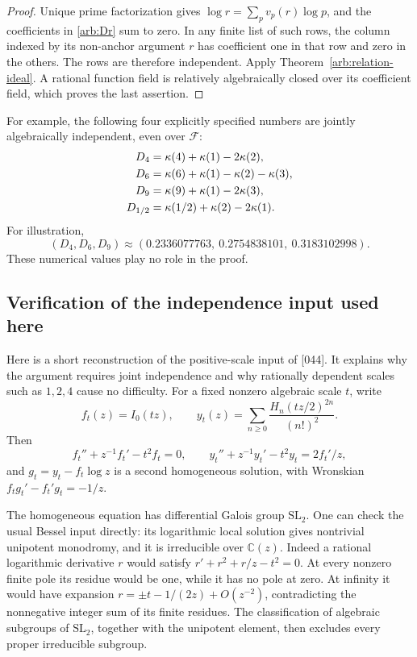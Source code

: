 \documentclass[11pt,a4paper]{article}
\theoremstyle{definition}
\theoremstyle{remark}
\numberwithin{equation}{section}
\begin{document}
\begin{proof}
Unique prime factorization gives
\(\log r=\sum_pv_p(r)\log p\), and the coefficients in
\eqref{arb:Dr} sum to zero.  In any finite list of such rows,
the column indexed by its non-anchor argument \(r\) has coefficient
one in that row and zero in the others.  The rows are therefore
independent.  Apply Theorem~\ref{arb:relation-ideal}.
A rational function field is relatively algebraically closed over
its coefficient field, which proves the last assertion.
\end{proof}

For example, the following four explicitly specified numbers are
jointly algebraically independent, even over \(\mathcal F\):
\begin{align*}
 D_4&=\kappa(4)+\kappa(1)-2\kappa(2),\\
 D_6&=\kappa(6)+\kappa(1)-\kappa(2)-\kappa(3),\\
 D_9&=\kappa(9)+\kappa(1)-2\kappa(3),\\
 D_{1/2}&=\kappa(1/2)+\kappa(2)-2\kappa(1).
\end{align*}
For illustration,
\[
 (D_4,D_6,D_9)\approx
 (0.2336077763,\ 0.2754838101,\ 0.3183102998).
\]
These numerical values play no role in the proof.

\subsection{Verification of the independence input used here}
\label{arb:input-audit}

Here is a short reconstruction of the positive-scale input of [044].
It explains why the argument requires joint independence and why
rationally dependent scales such as \(1,2,4\) cause no difficulty.
For a fixed nonzero algebraic scale \(t\), write
\[
 f_t(z)=I_0(tz),\qquad
 y_t(z)=\sum_{n\geq0}\frac{H_n(tz/2)^{2n}}{(n!)^2}.
\]
Then
\[
 f_t''+z^{-1}f_t'-t^2f_t=0,
 \qquad y_t''+z^{-1}y_t'-t^2y_t=2f_t'/z,
\]
and \(g_t=y_t-f_t\log z\) is a second homogeneous solution,
with Wronskian
\(f_tg_t'-f_t'g_t=-1/z\).

The homogeneous equation has differential Galois group
\(\mathrm{SL}_2\).  One can check the usual Bessel input directly:
its logarithmic local solution gives nontrivial unipotent monodromy,
and it is irreducible over \(\mathbb C(z)\).
Indeed a rational logarithmic derivative \(r\) would satisfy
\(r'+r^2+r/z-t^2=0\).
At every nonzero finite pole its residue would be one, while it has
no pole at zero.  At infinity it would have expansion
\(r=\pm t-1/(2z)+O(z^{-2})\), contradicting the nonnegative integer
sum of its finite residues.  The classification of algebraic
subgroups of \(\mathrm{SL}_2\), together with the unipotent element,
then excludes every proper irreducible subgroup.
\end{document}
